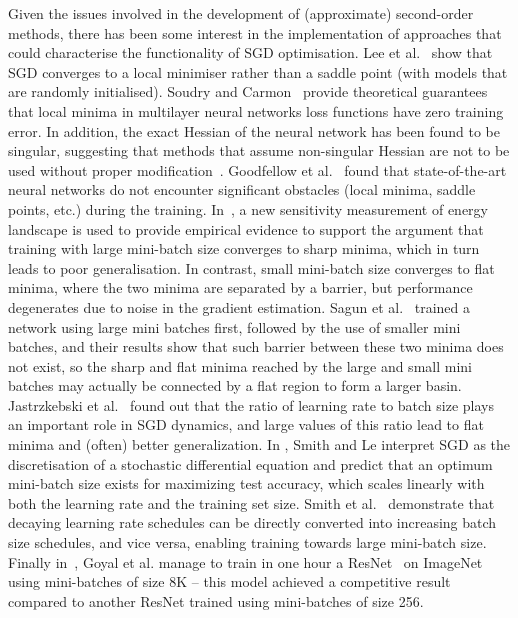 \documentclass[10pt,journal,compsoc]{IEEEtran}
\begin{document}
Given the issues involved in the development of (approximate) second-order methods, there has been some interest in the implementation of approaches that could characterise the functionality of SGD optimisation.
Lee et al.~\cite{lee2016gradient} show that SGD converges to a local minimiser rather than a saddle point (with models that are randomly initialised).
Soudry and Carmon~\cite{soudry2016no} provide theoretical guarantees that local minima in multilayer neural networks loss functions have zero training error.
In addition, the exact Hessian of the neural network has been found to be singular, suggesting that methods that assume non-singular Hessian are not to be used without proper modification~\cite{sagun2016singularity}.
Goodfellow et al.~\cite{goodfellow2014qualitatively} found that state-of-the-art neural networks do not encounter significant obstacles (local minima, saddle points, etc.) during the training.
In~\cite{keskar2016large}, a new sensitivity measurement of energy landscape is used to provide empirical evidence to support the argument that training with large mini-batch size converges to sharp minima, which in turn leads to poor generalisation. In contrast, small mini-batch size converges to flat minima, where the two minima are separated by a barrier, but performance degenerates due to noise in the gradient estimation.
Sagun et al.~\cite{sagun2017empirical} trained a network using large mini batches first, followed by the use of smaller mini batches, and their results show that such barrier between these two minima does not exist, so the sharp and flat minima reached by the large and small mini batches may actually be connected by a flat region to form a larger basin. %
Jastrzkebski et al.~\cite{jastrzkebski2017three} found out that the ratio of learning rate to batch size plays an important role in SGD dynamics, and large values of this ratio lead to flat minima and (often) better generalization.
In \cite{smith2017bayesian}, Smith and Le interpret SGD as the discretisation of a stochastic differential equation and predict that an optimum mini-batch size exists for maximizing test accuracy, which scales linearly with both the learning rate and the training set size.
Smith et al.~\cite{smith2017don} demonstrate that decaying learning rate schedules can be directly converted into increasing batch size schedules, and vice versa, enabling training towards large mini-batch size.
Finally in~\cite{goyal2017accurate}, Goyal et al. manage to train in one hour a ResNet~\cite{he2016deep} on ImageNet~\cite{ILSVRCarxiv14} using  mini-batches of size 8K -- this model achieved a competitive result compared to another ResNet trained using mini-batches of size 256.
\end{document}
